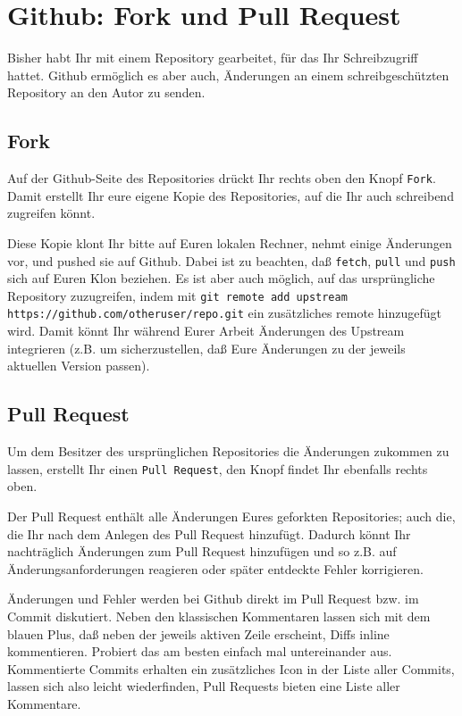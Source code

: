 \documentclass[a4paper, 12pt]{article}
\begin{document}
\section{Github: Fork und Pull Request}

Bisher habt Ihr mit einem Repository gearbeitet, für das Ihr Schreibzugriff hattet. Github ermöglich es aber auch, Änderungen an einem schreibgeschützten Repository an den Autor zu senden.

\subsection*{Fork}\vspace{-1.5ex}
Auf der Github-Seite des Repositories drückt Ihr rechts oben den Knopf \texttt{Fork}. Damit erstellt Ihr eure eigene Kopie des Repositories, auf die Ihr auch schreibend zugreifen könnt.

Diese Kopie klont Ihr bitte auf Euren lokalen Rechner, nehmt einige Änderungen vor, und pushed sie auf Github. Dabei ist zu beachten, daß \texttt{fetch}, \texttt{pull} und \texttt{push} sich auf Euren Klon beziehen. Es ist aber auch möglich, auf das ursprüngliche Repository zuzugreifen, indem mit \texttt{git remote add upstream https://github.com/otheruser/repo.git} ein zusätzliches remote hinzugefügt wird. Damit könnt Ihr während Eurer Arbeit Änderungen des Upstream integrieren (z.B. um sicherzustellen, daß Eure Änderungen zu der jeweils aktuellen Version passen).


\subsection*{Pull Request}\vspace{-1.5ex}

Um dem Besitzer des ursprünglichen Repositories die Änderungen zukommen zu lassen, erstellt Ihr einen \texttt{Pull Request}, den Knopf findet Ihr ebenfalls rechts oben.

Der Pull Request enthält alle Änderungen Eures geforkten Repositories; auch die, die Ihr nach dem Anlegen des Pull Request hinzufügt. Dadurch könnt Ihr nachträglich Änderungen zum Pull Request hinzufügen und so z.B. auf Änderungsanforderungen reagieren oder später entdeckte Fehler korrigieren.

Änderungen und Fehler werden bei Github direkt im Pull Request bzw. im Commit diskutiert. Neben den klassischen Kommentaren lassen sich mit dem blauen Plus, daß neben der jeweils aktiven Zeile erscheint, Diffs inline kommentieren. Probiert das am besten einfach mal untereinander aus. Kommentierte Commits erhalten ein zusätzliches Icon in der Liste aller Commits, lassen sich also leicht wiederfinden, Pull Requests bieten eine Liste aller Kommentare.
\end{document}

